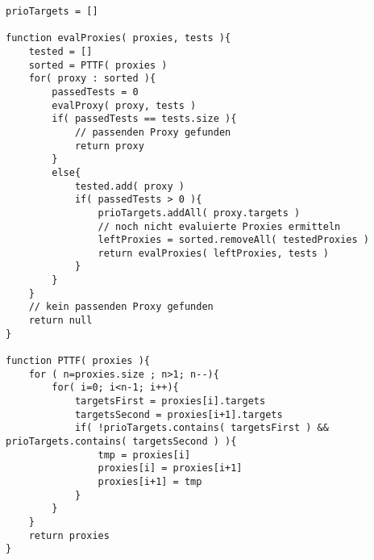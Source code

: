 \begin{lstlisting}[style = pseudo, caption = Semantische Evaluation mit Heuristik PTTF, captionpos = b, label = lst_pttf]
prioTargets = []

function evalProxies( proxies, tests ){
	tested = []
	sorted = PTTF( proxies )
	for( proxy : sorted ){
		passedTests = 0
		evalProxy( proxy, tests )
		if( passedTests == tests.size ){
			// passenden Proxy gefunden
			return proxy
		}
		else{
			tested.add( proxy )
			if( passedTests > 0 ){
				prioTargets.addAll( proxy.targets )
				// noch nicht evaluierte Proxies ermitteln
				leftProxies = sorted.removeAll( testedProxies )
				return evalProxies( leftProxies, tests )
			}
		}
	}
	// kein passenden Proxy gefunden
	return null
}

function PTTF( proxies ){
	for	( n=proxies.size ; n>1; n--){
		for( i=0; i<n-1; i++){
			targetsFirst = proxies[i].targets
			targetsSecond = proxies[i+1].targets			
			if( !prioTargets.contains( targetsFirst ) && prioTargets.contains( targetsSecond ) ){
				tmp = proxies[i]
				proxies[i] = proxies[i+1]
				proxies[i+1] = tmp
			}
		}
	}
	return proxies	
}
\end{lstlisting}

